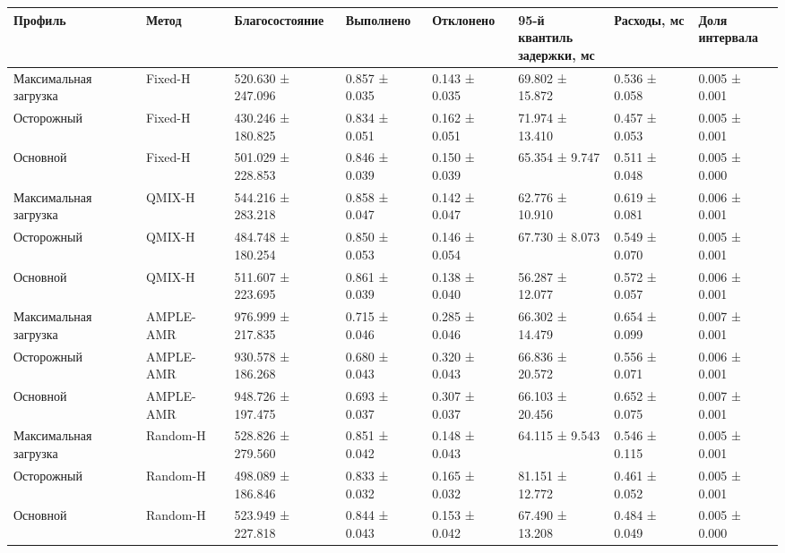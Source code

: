 \begin{tabular}{llllllll}
\toprule
 Профиль & Метод & Благосостояние & Выполнено & Отклонено & \shortstack{95-й квантиль\\задержки, мс} & Расходы, мс & \shortstack{Доля\\интервала} \\
\midrule
 Максимальная загрузка & Fixed-H & 520.630 ± 247.096 & 0.857 ± 0.035 & 0.143 ± 0.035 & 69.802 ± 15.872 & 0.536 ± 0.058 & 0.005 ± 0.001 \\
 Осторожный & Fixed-H & 430.246 ± 180.825 & 0.834 ± 0.051 & 0.162 ± 0.051 & 71.974 ± 13.410 & 0.457 ± 0.053 & 0.005 ± 0.001 \\
 Основной & Fixed-H & 501.029 ± 228.853 & 0.846 ± 0.039 & 0.150 ± 0.039 & 65.354 ± 9.747 & 0.511 ± 0.048 & 0.005 ± 0.000 \\
 Максимальная загрузка & QMIX-H & 544.216 ± 283.218 & 0.858 ± 0.047 & 0.142 ± 0.047 & 62.776 ± 10.910 & 0.619 ± 0.081 & 0.006 ± 0.001 \\
 Осторожный & QMIX-H & 484.748 ± 180.254 & 0.850 ± 0.053 & 0.146 ± 0.054 & 67.730 ± 8.073 & 0.549 ± 0.070 & 0.005 ± 0.001 \\
 Основной & QMIX-H & 511.607 ± 223.695 & 0.861 ± 0.039 & 0.138 ± 0.040 & 56.287 ± 12.077 & 0.572 ± 0.057 & 0.006 ± 0.001 \\
 Максимальная загрузка & AMPLE-AMR & 976.999 ± 217.835 & 0.715 ± 0.046 & 0.285 ± 0.046 & 66.302 ± 14.479 & 0.654 ± 0.099 & 0.007 ± 0.001 \\
 Осторожный & AMPLE-AMR & 930.578 ± 186.268 & 0.680 ± 0.043 & 0.320 ± 0.043 & 66.836 ± 20.572 & 0.556 ± 0.071 & 0.006 ± 0.001 \\
 Основной & AMPLE-AMR & 948.726 ± 197.475 & 0.693 ± 0.037 & 0.307 ± 0.037 & 66.103 ± 20.456 & 0.652 ± 0.075 & 0.007 ± 0.001 \\
 Максимальная загрузка & Random-H & 528.826 ± 279.560 & 0.851 ± 0.042 & 0.148 ± 0.043 & 64.115 ± 9.543 & 0.546 ± 0.115 & 0.005 ± 0.001 \\
 Осторожный & Random-H & 498.089 ± 186.846 & 0.833 ± 0.032 & 0.165 ± 0.032 & 81.151 ± 12.772 & 0.461 ± 0.052 & 0.005 ± 0.001 \\
 Основной & Random-H & 523.949 ± 227.818 & 0.844 ± 0.043 & 0.153 ± 0.042 & 67.490 ± 13.208 & 0.484 ± 0.049 & 0.005 ± 0.000 \\
\bottomrule
\end{tabular}
